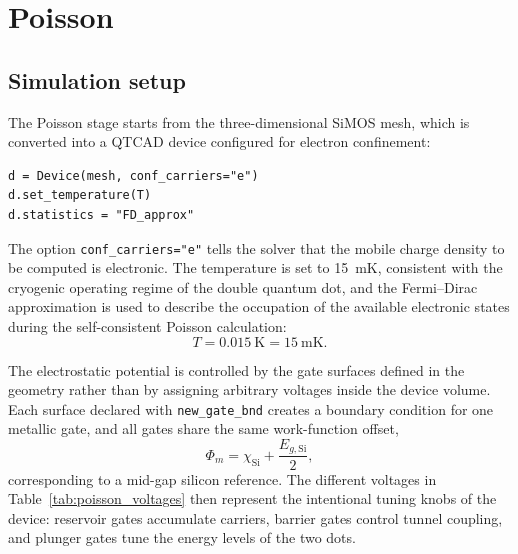 
\chapter{Poisson}
\section{Simulation setup}

The Poisson stage starts from the three-dimensional SiMOS mesh, which is
converted into a QTCAD device configured for electron confinement:
\begin{lstlisting}
d = Device(mesh, conf_carriers="e")
d.set_temperature(T)
d.statistics = "FD_approx"
\end{lstlisting}
The option \texttt{conf\_carriers="e"} tells the solver that the mobile charge
density to be computed is electronic. The temperature is set to
\SI{15}{\milli\kelvin}, consistent with the cryogenic operating regime of the
double quantum dot, and the Fermi--Dirac approximation is used to describe the
occupation of the available electronic states during the self-consistent
Poisson calculation:
\[
    T = \SI{0.015}{\kelvin} = \SI{15}{\milli\kelvin}.
\]

The electrostatic potential is controlled by the gate surfaces defined in the
geometry rather than by assigning arbitrary voltages inside the device volume.
Each surface declared with \texttt{new\_gate\_bnd} creates a boundary condition
for one metallic gate, and all gates share the same work-function offset,
\[
    \Phi_m = \chi_{\mathrm{Si}} + \frac{E_{g,\mathrm{Si}}}{2},
\]
corresponding to a mid-gap silicon reference. The different voltages in
Table~\ref{tab:poisson_voltages} then represent the intentional tuning knobs of
the device: reservoir gates accumulate carriers, barrier gates control tunnel
coupling, and plunger gates tune the energy levels of the two dots.

